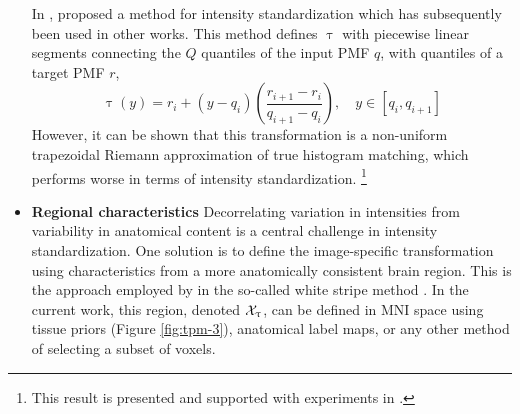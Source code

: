 \begin{itemize}
  In \cite{Nyul1999,Nyul2000}, \citeauthor{Nyul1999} proposed a method for intensity standardization which has subsequently been used in other works.
  This method defines $\uptau$ with piecewise linear segments connecting the $Q$ quantiles of the input PMF $q$, with quantiles of a target PMF $r$,
  \begin{equation}\uptau(y) = r_i + \left(y-q_i\right)\left(\frac{r_{i+1}-r_i}{q_{i+1}-q_i}\right),\quad y\in[q_i,q_{i+1}]\end{equation}
  However, it can be shown that this transformation is a non-uniform trapezoidal Riemann approximation of true histogram matching, which performs worse in terms of intensity standardization.%
  \footnote{This result is presented and supported with experiments in \cite{Knight2017}.}
  \item \textbf{Regional characteristics}
  Decorrelating variation in intensities from variability in anatomical content is a central challenge in intensity standardization.
  One solution is to define the image-specific transformation using characteristics from a more anatomically consistent brain region.
  This is the approach employed by \citeauthor{Shinohara2014} in the so-called white stripe method \cite{Shinohara2014}.
  In the current work, this region, denoted $\mathcal{X}_{\uptau}$, can be defined in MNI space using tissue priors (Figure \ref{fig:tpm-3}), anatomical label maps, or any other method of selecting a subset of voxels.
\end{itemize}

